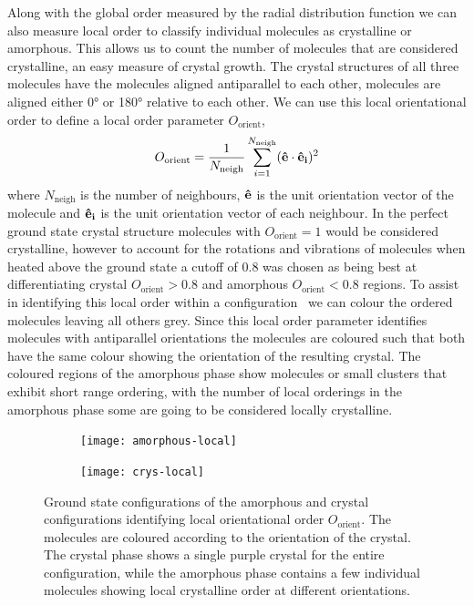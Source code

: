 Along with the global order measured by the radial distribution function we can also measure local order to classify individual molecules as crystalline or amorphous. This allows us to count the number of molecules that are considered crystalline, an easy measure of crystal growth. The crystal structures of all three molecules have the molecules aligned antiparallel to each other, molecules are aligned either \ang{0} or \ang{180} relative to each other. We can use this local orientational order to define a local order parameter $O_\text{orient}$,
\begin{equation}
    O_{\text{orient}} = \frac{1}{N_{\text{neigh}}}\sum_{i=1}^{N_\text{neigh}} (\mathbf{\hat e} \cdot \mathbf{\hat e_i})^2
\end{equation}
where $N_\text{neigh}$ is the number of neighbours, $\mathbf{\hat e}$ is the unit orientation vector of the molecule and $\mathbf{\hat e_i}$ is the unit orientation vector of each neighbour. In the perfect ground state crystal structure molecules with $O_\text{orient}=1$ would be considered crystalline, however to account for the rotations and vibrations of molecules when heated above the ground state a cutoff of \num{0.8} was chosen as being best at differentiating crystal $O_\text{orient}> 0.8$ and amorphous $O_\text{orient} < 0.8$ regions. To assist in identifying this local order within a configuration~ we can colour the ordered molecules leaving all others grey. Since this local order parameter identifies molecules with antiparallel orientations the molecules are coloured such that both have the same colour showing the orientation of the resulting crystal. The coloured regions of the amorphous phase show molecules or small clusters that exhibit short range ordering, with the number of local orderings in the amorphous phase some are going to be considered locally crystalline.

\begin{figure}
    \begin{subfigure}{0.5\textwidth}
        \texttt{[image: amorphous-local]}
        \caption{}
        \label{fig:amorphous local}
    \end{subfigure}
    \begin{subfigure}{0.5\textwidth}
        \texttt{[image: crys-local]}
        \caption{}
        \label{fig:crys local}
    \end{subfigure}
    \caption{Ground state configurations of the amorphous  and crystal  configurations identifying local orientational order $O_\text{orient}$. The molecules are coloured according to the orientation of the crystal. The crystal phase shows a single purple crystal for the entire configuration, while the amorphous phase contains a few individual molecules showing local crystalline order at different orientations.}
    \label{fig:orient comp}
\end{figure}


